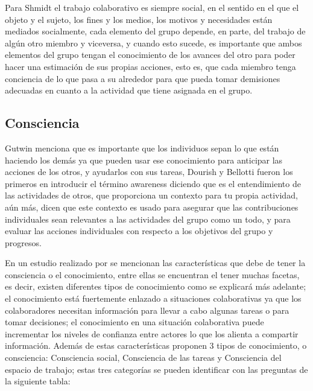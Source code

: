 Para Shmidt \cite{schmidt1992taking} el trabajo colaborativo es siempre social, en el sentido en el que el objeto y el sujeto, los fines y los medios, los motivos y necesidades est\'an mediados socialmente, cada elemento del grupo depende, en parte, del trabajo de alg\'un otro miembro y viceversa, y cuando esto sucede, es importante que ambos elementos del grupo tengan el conocimiento de los avances del otro para poder hacer una estimaci\'on de sus propias acciones, esto es, que cada miembro tenga conciencia de lo que pasa a su alrededor para que pueda tomar demisiones adecuadas en cuanto a la actividad que tiene asignada en el grupo.

\subsection{Consciencia}

Gutwin \cite{gutwin1996supporting} menciona que es importante que los individuos sepan lo que est\'an haciendo los dem\'as ya que pueden usar ese conocimiento para anticipar las acciones de los otros, y ayudarlos con sus tareas, Dourish y Bellotti \cite{dourish1992awareness} fueron los primeros en introducir el t\'ermino awareness diciendo que es el entendimiento de las actividades de otros, que proporciona un contexto para tu propia actividad, a\'un m\'as, dicen que este contexto es usado para asegurar que las contribuciones individuales sean relevantes a las actividades del grupo como un todo, y para evaluar las acciones individuales con respecto a los objetivos del grupo y progresos. 

En un estudio realizado por \cite{Belkadi2013110} se mencionan las caracter\'isticas que debe de tener la consciencia o el conocimiento, entre ellas se encuentran el tener muchas facetas, es decir, existen diferentes tipos de conocimiento como se explicar\'a m\'as adelante; el conocimiento est\'a fuertemente enlazado a situaciones colaborativas ya que los colaboradores necesitan informaci\'on para llevar a cabo algunas tareas o para tomar decisiones; el conocimiento en una situaci\'on colaborativa puede incrementar los niveles de confianza entre actores lo que los alienta a compartir informaci\'on. Adem\'as de estas caracter\'isticas proponen 3 tipos de conocimiento, o consciencia: Consciencia social, Consciencia de las tareas y Consciencia del espacio de trabajo; estas tres categor\'ias se pueden identificar con las preguntas de la siguiente tabla:

